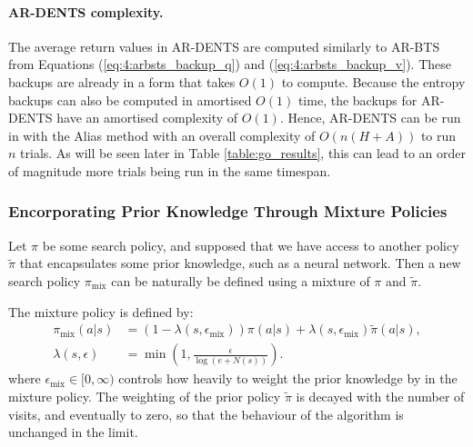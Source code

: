         \paragraph{AR-DENTS complexity.} The average return values in AR-DENTS are computed similarly to AR-BTS from Equations (\ref{eq:4:arbsts_backup_q}) and (\ref{eq:4:arbsts_backup_v}). These backups are already in a form that takes $O(1)$ to compute. Because the entropy backups can also be computed in amortised $O(1)$ time, the backups for AR-DENTS have an amortised complexity of $O(1)$. Hence, AR-DENTS can be run in \mctsmode\ewe with the Alias method with an overall complexity of $O(n(H+A))$ to run $n$ trials. As will be seen later in Table \ref{table:go_results}, this can lead to an order of magnitude more trials being run in the same timespan.
        


        






        \subsubsection{Encorporating Prior Knowledge Through Mixture Policies}

        Let $\pi$ be some \thtspp\ewe search policy, and supposed that we have access to another policy $\tilde{\pi}$ that encapsulates some prior knowledge, such as a neural network. Then a new search policy $\pi_{\text{mix}}$ can be naturally be defined using a mixture of $\pi$ and $\tilde{\pi}$.

        The mixture policy is defined by:
        \begin{align}
            \pi_{\text{mix}}(a|s) &= 
                (1-\lambda(s,\epsilon_{\text{mix}})) \pi(a|s) 
                + \lambda(s,\epsilon_{\text{mix}}) \tilde{\pi}(a|s),\\
            \lambda(s,\epsilon) &= \min\left(1, \frac{\epsilon}{\log(e+N(s))}\right).
        \end{align}
        where $\epsilon_{\text{mix}}\in[0,\infty)$ controls how heavily to weight the prior knowledge by in the mixture policy. The weighting of the prior policy $\tilde{\pi}$ is decayed with the number of visits, and eventually to zero, so that the behaviour of the algorithm is unchanged in the limit.
        

















